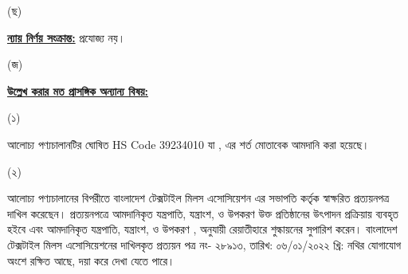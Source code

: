\documentclass[12pt]{article}
\newcommand{\hscode}{39234010}
\newcommand{\btmaltno}{প্রত্যয়ন পত্র নং- ২৮৯১৩}
\newcommand{\btmaltnodt}{তারিখ: ০৬/০১/২০২২ খ্রি:}
\begin{document}
\begin{minipage}[t]{0.05\linewidth}
(ছ)
\end{minipage}
\begin{minipage}[t]{0.90\linewidth}
\underline{\textbf{ন্যায় নির্ণয় সংক্রান্ত:}} প্রযোজ্য নয়।
\\
\end{minipage}
\begin{minipage}[t]{0.05\linewidth}
\hspace{1em}
\end{minipage}
\begin{minipage}[t]{0.05\linewidth}
(জ)
\end{minipage}
\begin{minipage}[t]{0.05\linewidth}
\end{minipage}
\begin{minipage}[t]{0.90\linewidth}
\underline{\textbf{উল্লেখ করার মত প্রাসঙ্গিক অন্যান্য বিষয়:}}
\end{minipage}
\begin{minipage}[t]{0.05\linewidth}
\hspace{1em}
\end{minipage}
\begin{minipage}[t]{0.05\linewidth}
\hspace{1em}
\end{minipage}
\begin{minipage}[t]{0.05\linewidth}
(১)
\end{minipage}
\begin{minipage}[t]{0.85\linewidth}
আলোচ্য পণ্যচালানটির ঘোষিত HS Code {\hscode}
যা {\srootz}, {\srootzd} এর শর্ত মোতাবেক
আমদানি করা হয়েছে।
\\
\end{minipage}
\begin{minipage}[t]{0.05\linewidth}
\hspace{1em}
\end{minipage}
\begin{minipage}[t]{0.05\linewidth}
\hspace{1em}
\end{minipage}
\begin{minipage}[t]{0.05\linewidth}
(২)
\end{minipage}
\begin{minipage}[t]{0.85\linewidth}
আলোচ্য পণ্যচালানের বিপরীতে বাংলাদেশ
টেক্সটাইল মিলস এসোসিয়েশন এর সভাপতি
কর্তৃক স্বাক্ষরিত প্রত্যয়নপত্র
দাখিল করেছেন। প্রত্যয়নপত্রে আমদানিকৃত
যন্ত্রপাতি, যন্ত্রাংশ, ও উপকরণ
উক্ত প্রতিষ্ঠানের উৎপাদন প্রক্রিয়ায়
ব্যবহৃত হইবে এবং আমদানিকৃত
যন্ত্রপাতি, যন্ত্রাংশ, ও উপকরণ
{\srootz}, {\srootzd} অনুযায়ী
রেয়াতীহারে শুল্কায়নের সুপারিশ
করেন। বাংলাদেশ টেক্সটাইল মিলস
এসোসিয়েশনের দাখিলকৃত
{\btmaltno},
{\btmaltnodt}
নথির যোগাযোগ অংশে রক্ষিত
আছে, দয়া করে দেখা যেতে পারে।
\\
\end{minipage}
\end{document}
